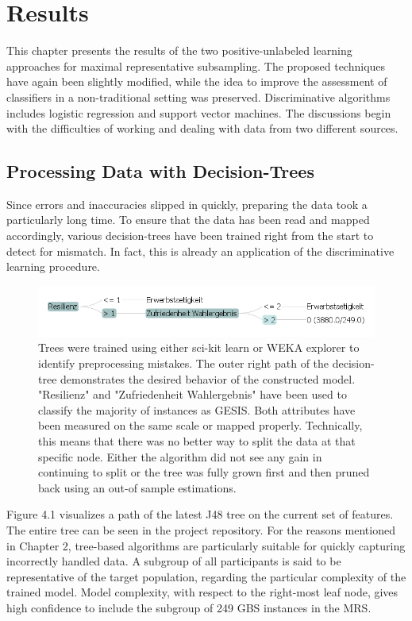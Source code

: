 \chapter{Results}\label{Sec:Results}

This chapter presents the results of the two positive-unlabeled learning approaches for maximal representative subsampling. The proposed techniques have again been slightly modified, while the idea to improve the assessment of classifiers in a non-traditional setting was preserved. Discriminative algorithms includes logistic regression and support vector machines. The discussions begin with the difficulties of working and dealing with data from two different sources.

\section{Processing Data with Decision-Trees}

Since errors and inaccuracies slipped in quickly, preparing the data took a particularly long time. To ensure that the data has been read and mapped accordingly, various decision-trees have been trained right from the start to detect for mismatch. In fact, this is already an application of the discriminative learning procedure.

\begin{figure}[ht]
\centering
\vspace{0.25cm}
   \includegraphics[scale=0.65,angle=0]{fig/treepath}
\captionsetup{width= 380pt}
\caption{Trees were trained using either sci-kit learn or WEKA explorer to identify preprocessing mistakes. The outer right path of the decision-tree demonstrates the desired behavior of the constructed model. "Resilienz"  and "Zufriedenheit Wahlergebnis" have been used to classify the majority of instances as GESIS. Both attributes have been measured on the same scale or mapped properly. Technically, this means that there was no better way to split the data at that specific node. Either the algorithm did not see any gain in continuing to split or the tree was fully grown first and then pruned back using an out-of sample estimations.}
\end{figure}

Figure 4.1 visualizes a path of the latest J48 tree on the current set of features. The entire tree can be seen in the project repository. For the reasons mentioned in Chapter 2, tree-based algorithms are particularly suitable for quickly capturing incorrectly handled data. A subgroup of all participants is said to be representative of the target population, regarding the particular complexity of the trained model. Model complexity, with respect to the right-most leaf node, gives high confidence to include the subgroup of 249 GBS instances in the MRS. 

